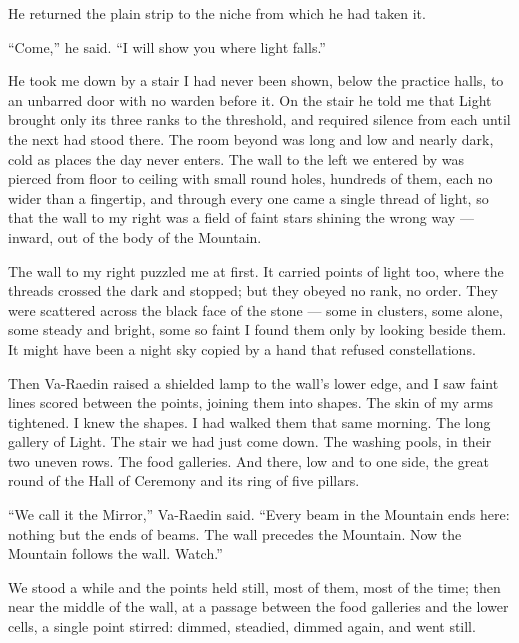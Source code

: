 He returned the plain strip to the niche from which he had taken it.\par

``Come,'' he said. ``I will show you where light falls.''\par

\ornament

He took me down by a stair I had never been shown, below the practice halls, to an unbarred door with no warden before it. On the stair he told me that Light brought only its three ranks to the threshold, and required silence from each until the next had stood there. The room beyond was long and low and nearly dark, cold as places the day never enters. The wall to the left we entered by was pierced from floor to ceiling with small round holes, hundreds of them, each no wider than a fingertip, and through every one came a single thread of light, so that the wall to my right was a field of faint stars shining the wrong way --- inward, out of the body of the Mountain.\par

The wall to my right puzzled me at first. It carried points of light too, where the threads crossed the dark and stopped; but they obeyed no rank, no order. They were scattered across the black face of the stone --- some in clusters, some alone, some steady and bright, some so faint I found them only by looking beside them. It might have been a night sky copied by a hand that refused constellations.\par

Then Va-Raedin raised a shielded lamp to the wall's lower edge, and I saw faint lines scored between the points, joining them into shapes. The skin of my arms tightened. I knew the shapes. I had walked them that same morning. The long gallery of Light. The stair we had just come down. The washing pools, in their two uneven rows. The food galleries. And there, low and to one side, the great round of the Hall of Ceremony and its ring of five pillars.\par

``We call it the Mirror,'' Va-Raedin said. ``Every beam in the Mountain ends here: nothing but the ends of beams. The wall precedes the Mountain. Now the Mountain follows the wall. Watch.''\par

We stood a while and the points held still, most of them, most of the time; then near the middle of the wall, at a passage between the food galleries and the lower cells, a single point stirred: dimmed, steadied, dimmed again, and went still.\par

